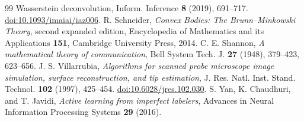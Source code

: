 \begin{thebibliography}{99}
{Wasserstein deconvolution}, Inform. Inference \textbf{8} (2019), 691--717.
\href{https://doi.org/10.1093/imaiai/iaz006}{doi:10.1093/imaiai/iaz006}.
R. Schneider, \emph{Convex Bodies: The Brunn--Minkowski Theory},
second expanded edition, Encyclopedia of Mathematics and its Applications
\textbf{151}, Cambridge University Press, 2014.
C. E. Shannon, \emph{A mathematical theory of communication},
Bell System Tech. J. \textbf{27} (1948), 379--423, 623--656.
J. S. Villarrubia, \emph{Algorithms for scanned probe microscope image
simulation, surface reconstruction, and tip estimation},
J. Res. Natl. Inst. Stand. Technol. \textbf{102} (1997), 425--454.
\href{https://doi.org/10.6028/jres.102.030}{doi:10.6028/jres.102.030}.
S. Yan, K. Chaudhuri, and T. Javidi,
\emph{Active learning from imperfect labelers},
Advances in Neural Information Processing Systems \textbf{29} (2016).
\end{thebibliography}
